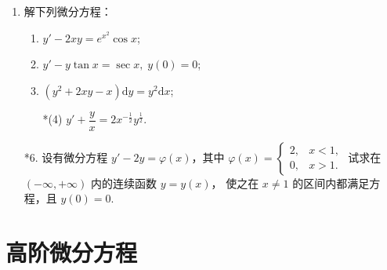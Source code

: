 \begin{enumerate}
    \item 解下列微分方程：
    \begin{enumerate}[(1)]\setlength{\itemsep}{5pt}\setlength{\topsep}{15pt}
        \item $y'-2xy=e^{x^2}\cos x$;
        \item $y'-y\tan x=\sec x,\;y(0)=0$;
        \item $(y^2+2xy-x)\text{d}y=y^2\text{d}x$;
        \item[*(4)] $y'+\dfrac{y}{x}=2x^{-\frac{1}{2}}y^{\frac{1}{2}}$.
    \end{enumerate}

    \item[*6.] 设有微分方程 $y'-2y=\varphi(x)$，其中 $\varphi(x)=\begin{cases}
        2,&x<1,\\
        0,&x>1.
    \end{cases}$ 试求在 $(-\infty,+\infty)$ 内的连续函数 $y=y(x)$，
    使之在 $x\not=1$ 的区间内都满足方程，且 $y(0)=0$.

\end{enumerate}

\section{高阶微分方程}

